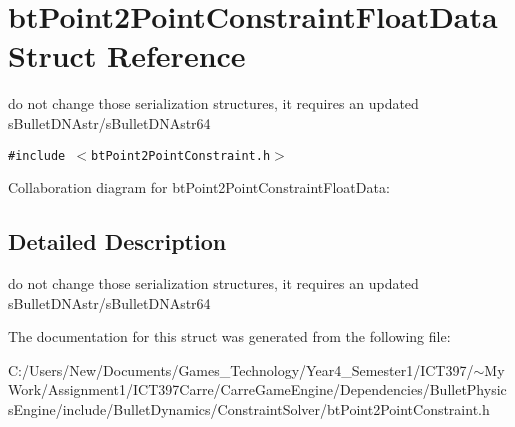\hypertarget{structbt_point2_point_constraint_float_data}{
\section{btPoint2PointConstraintFloatData Struct Reference}
\label{structbt_point2_point_constraint_float_data}
}
do not change those serialization structures, it requires an updated sBulletDNAstr/sBulletDNAstr64  


{\tt \#include $<$btPoint2PointConstraint.h$>$}

Collaboration diagram for btPoint2PointConstraintFloatData:

\subsection{Detailed Description}
do not change those serialization structures, it requires an updated sBulletDNAstr/sBulletDNAstr64 

The documentation for this struct was generated from the following file:\begin{CompactItemize}
\item 
C:/Users/New/Documents/Games\_\-Technology/Year4\_\-Semester1/ICT397/$\sim$My Work/Assignment1/ICT397Carre/CarreGameEngine/Dependencies/BulletPhysicsEngine/include/BulletDynamics/ConstraintSolver/btPoint2PointConstraint.h\end{CompactItemize}

